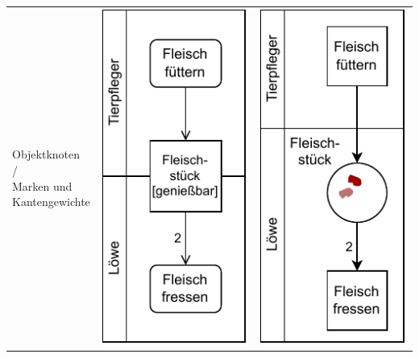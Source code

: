 \begin{longtable}{p{\sttpHilfA}|c|c}
		\hline %
		
			\parbox{\sttpHilfA}{\centering
				Objektknoten \\ / \\ Marken und \\ Kantengewichte} 
		& 
			\parbox{\sttpHilfB}{\centering
				\vspace{\sttpAbstandRand}
				\includegraphics[scale=\sttpFaktor]{Bilder/Kapitel-5/gegenueberstellung_5a.pdf}
				\vspace{\sttpAbstandRand}
			}
		& 
			\parbox{\sttpHilfB}{\centering
				\vspace{\sttpAbstandRand}
				\includegraphics[scale=\sttpFaktor]{Bilder/Kapitel-5/gegenueberstellung_5b.pdf}
				\vspace{\sttpAbstandRand}
			} 
		\\


\end{longtable}
